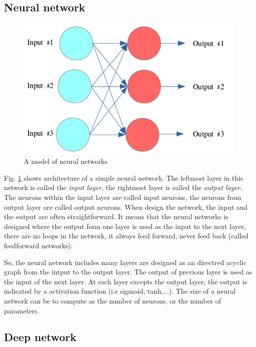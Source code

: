 \subsection{Neural network}

\begin{figure}[h]
	\centering
	\includegraphics[scale=0.5]{images/neural_net}
	\caption{A model of neural networks}
	\label{fignnnetworks}
\end{figure}

Fig. \ref{fignnnetworks} shows architecture of a simple neural network. The leftmost layer in this network is called the \textit{input layer}, the rightmost layer is called the \textit{output layer}. The neurons within the input layer are called input neurons, the neurons from output layer are called output neurons. When design the network, the input and the output are often straightforward. It means that the neural networks is designed where the output form one layer is used as the input to the next layer, there are no loops in the network, it always feed forward, never feed back (called feedforward networks).

So, the neural network includes many layers are designed as an directred acyclic graph from the intput to the output layer. The output of previous layer is used as the input of the next layer. At each layer excepts the output layer, the output is indicated by a activation function (i.e sigmoid, tanh,...). The size of a neural network can be to compute as the number of neurons, or the number of parameters.

\subsection{Deep network}

